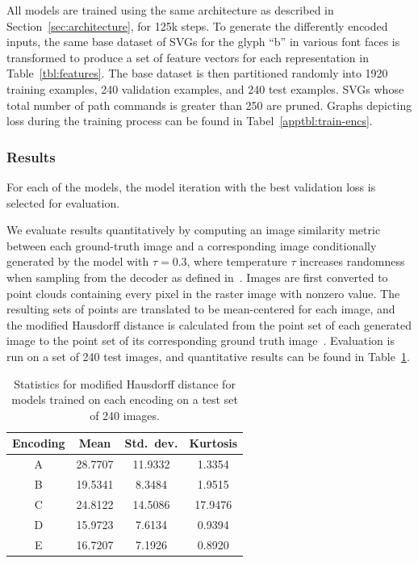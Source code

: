All models are trained using the same architecture as described in Section~\ref{sec:architecture}, for 125k steps.
To generate the differently encoded inputs, the same base dataset of SVGs for the glyph ``b'' in various font faces is transformed to produce a set of feature vectors for each representation in Table~\ref{tbl:features}.
The base dataset is then partitioned randomly into 1920 training examples, 240 validation examples, and 240 test examples.
SVGs whose total number of path commands is greater than 250 are pruned.
Graphs depicting loss during the training process can be found in Tabel~\ref{apptbl:train-encs}.

\subsubsection{Results}
For each of the models, the model iteration with the best validation loss is selected for evaluation.

We evaluate results quantitatively by computing an image similarity metric between each ground-truth image and a corresponding image conditionally generated by the model with $\tau = 0.3$, where temperature $\tau$ increases randomness when sampling from the decoder as defined in~\cite{ha2017neural}.
Images are first converted to point clouds containing every pixel in the raster image with nonzero value.
The resulting sets of points are translated to be mean-centered for each image, and the modified Hausdorff distance is calculated from the point set of each generated image to the point set of its corresponding ground truth image~\cite{dubuisson1994modified}.
Evaluation is run on a set of 240 test images, and quantitative results can be found in Table~\ref{tbl:encoding-results}.

\begin{table}[t]
\centering
\caption[Quantitative results for evaluating feature encodings]{Statistics for modified Hausdorff distance for models trained on each encoding on a test set of 240 images.\label{tbl:encoding-results}}
\begin{tabular}{c c c c}
\toprule
    Encoding & Mean & Std.\ dev. & Kurtosis \\ \midrule
    A & 28.7707 & 11.9332 & 1.3354 \\
    B & 19.5341 & 8.3484 & 1.9515 \\
    C & 24.8122 & 14.5086 & 17.9476 \\
    D & 15.9723 & 7.6134 & 0.9394 \\
    E & 16.7207 & 7.1926 & 0.8920 \\
\end{tabular}
\end{table}

